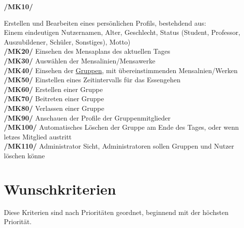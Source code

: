 \documentclass[a4paper]{scrreprt}
\begin{document}
\begin{addmargin}[25pt]{0pt} 
\hypertarget{mk10}{\textbf{/MK10/}} Erstellen und Bearbeiten eines persönlichen Profils, bestehdend aus: \\ Einem eindeutigen Nutzernamen, Alter, Geschlecht, Status (Student, Professor, Auszubildener, Schüler, Sonstiges), Motto)\\
\hypertarget{mk20}{\textbf{/MK20/}} Einsehen des Mensaplans des aktuellen Tages\\
\hypertarget{mk30}{\textbf{/MK30/}} Auswählen der Mensalinien/Mensawerke\\
\hypertarget{mk40}{\textbf{/MK40/}} Einsehen der \hyperlink{gruppe}{Gruppen}, mit übereinstimmenden Mensalnien/Werken\\
\hypertarget{mk50}{\textbf{/MK50/}} Einstellen eines Zeitintervalls für das Essengehen \\
\hypertarget{mk60}{\textbf{/MK60/}} Erstellen einer Gruppe\\
\hypertarget{mk70}{\textbf{/MK70/}} Beitreten einer Gruppe\\
\hypertarget{mk80}{\textbf{/MK80/}} Verlassen einer Gruppe\\
\hypertarget{mk90}{\textbf{/MK90/}} Anschauen der Profile der Gruppenmitglieder\\
\hypertarget{mk100}{\textbf{/MK100/}} Automatisches Löschen der Gruppe am Ende des Tages, oder wenn letzes Mitglied austritt\\
\hypertarget{mk110}{\textbf{/MK110/}} Administrator Sicht, Administratoren sollen Gruppen und Nutzer löschen könne\\
\end{addmargin}

\section{Wunschkriterien}
Diese Kriterien sind nach Prioritäten geordnet, beginnend mit der höchsten Priorität.
\end{document}
